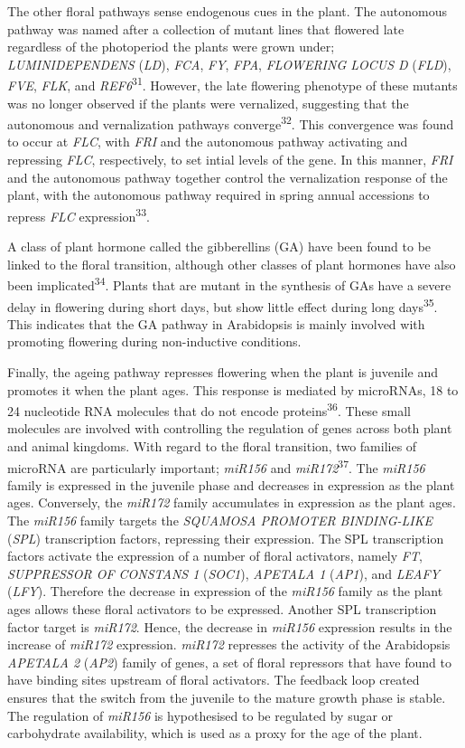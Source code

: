 \documentclass[12pt,]{book}
\begin{document}
The other floral pathways sense endogenous cues in the plant. The
autonomous pathway was named after a collection of mutant lines that
flowered late regardless of the photoperiod the plants were grown under;
\emph{LUMINIDEPENDENS} (\emph{LD}), \emph{FCA}, \emph{FY}, \emph{FPA},
\emph{FLOWERING LOCUS D} (\emph{FLD}), \emph{FVE}, \emph{FLK}, and
\emph{REF6}\textsuperscript{31}. However, the late flowering phenotype
of these mutants was no longer observed if the plants were vernalized,
suggesting that the autonomous and vernalization pathways
converge\textsuperscript{32}. This convergence was found to occur at
\emph{FLC}, with \emph{FRI} and the autonomous pathway activating and
repressing \emph{FLC}, respectively, to set intial levels of the gene.
In this manner, \emph{FRI} and the autonomous pathway together control
the vernalization response of the plant, with the autonomous pathway
required in spring annual accessions to repress \emph{FLC}
expression\textsuperscript{33}.

A class of plant hormone called the gibberellins (GA) have been found to
be linked to the floral transition, although other classes of plant
hormones have also been implicated\textsuperscript{34}. Plants that are
mutant in the synthesis of GAs have a severe delay in flowering during
short days, but show little effect during long days\textsuperscript{35}.
This indicates that the GA pathway in Arabidopsis is mainly involved
with promoting flowering during non-inductive conditions.

Finally, the ageing pathway represses flowering when the plant is
juvenile and promotes it when the plant ages. This response is mediated
by microRNAs, 18 to 24 nucleotide RNA molecules that do not encode
proteins\textsuperscript{36}. These small molecules are involved with
controlling the regulation of genes across both plant and animal
kingdoms. With regard to the floral transition, two families of microRNA
are particularly important; \emph{miR156} and
\emph{miR172}\textsuperscript{37}. The \emph{miR156} family is expressed
in the juvenile phase and decreases in expression as the plant ages.
Conversely, the \emph{miR172} family accumulates in expression as the
plant ages. The \emph{miR156} family targets the \emph{SQUAMOSA PROMOTER
BINDING-LIKE} (\emph{SPL}) transcription factors, repressing their
expression. The SPL transcription factors activate the expression of a
number of floral activators, namely \emph{FT}, \emph{SUPPRESSOR OF
CONSTANS 1} (\emph{SOC1}), \emph{APETALA 1} (\emph{AP1}), and
\emph{LEAFY} (\emph{LFY}). Therefore the decrease in expression of the
\emph{miR156} family as the plant ages allows these floral activators to
be expressed. Another SPL transcription factor target is \emph{miR172}.
Hence, the decrease in \emph{miR156} expression results in the increase
of \emph{miR172} expression. \emph{miR172} represses the activity of the
Arabidopsis \emph{APETALA 2} (\emph{AP2}) family of genes, a set of
floral repressors that have found to have binding sites upstream of
floral activators. The feedback loop created ensures that the switch
from the juvenile to the mature growth phase is stable. The regulation
of \emph{miR156} is hypothesised to be regulated by sugar or
carbohydrate availability, which is used as a proxy for the age of the
plant.
\end{document}
